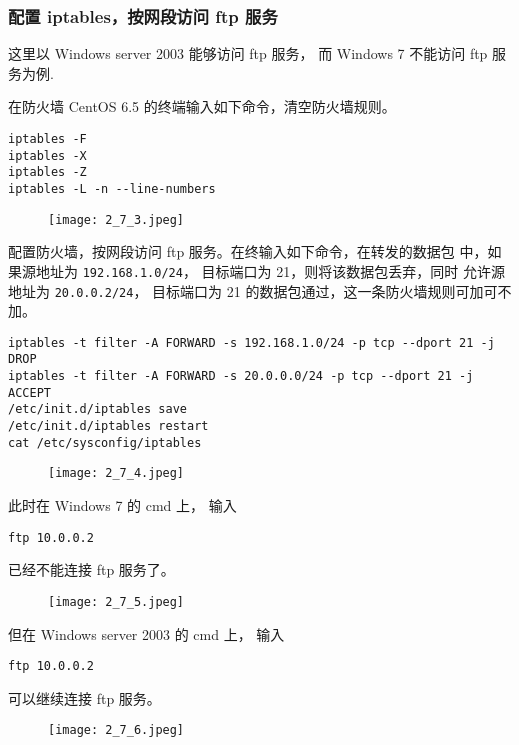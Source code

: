\subsubsection{配置 iptables，按网段访问 ftp 服务}
这里以 Windows server 2003 能够访问 ftp 服务，
而 Windows 7 不能访问 ftp 服务为例.

在防火墙 CentOS 6.5 的终端输入如下命令，清空防火墙规则。
\begin{verbatim}
iptables -F
iptables -X
iptables -Z
iptables -L -n --line-numbers
\end{verbatim}
\begin{figure}[H]
  \begin{center}
    \texttt{[image: 2\_7\_3.jpeg]}
  \end{center}
\end{figure}

配置防火墙，按网段访问 ftp 服务。在终输入如下命令，在转发的数据包
中，如果源地址为 \texttt{192.168.1.0/24}，
目标端口为 21，则将该数据包丢弃，同时
允许源地址为 \texttt{20.0.0.2/24}，
目标端口为 21 的数据包通过，这一条防火墙规则可加可不加。
\begin{verbatim}
iptables -t filter -A FORWARD -s 192.168.1.0/24 -p tcp --dport 21 -j DROP
iptables -t filter -A FORWARD -s 20.0.0.0/24 -p tcp --dport 21 -j ACCEPT
/etc/init.d/iptables save
/etc/init.d/iptables restart
cat /etc/sysconfig/iptables
\end{verbatim}
\begin{figure}[H]
  \begin{center}
    \texttt{[image: 2\_7\_4.jpeg]}
  \end{center}
\end{figure}

此时在 Windows 7 的 cmd 上，
输入
\begin{verbatim}
ftp 10.0.0.2
\end{verbatim}
已经不能连接 ftp 服务了。
\begin{figure}[H]
  \begin{center}
    \texttt{[image: 2\_7\_5.jpeg]}
  \end{center}
\end{figure}

但在 Windows server 2003 的 cmd 上，
输入
\begin{verbatim}
ftp 10.0.0.2
\end{verbatim}
可以继续连接 ftp 服务。
\begin{figure}[H]
  \begin{center}
    \texttt{[image: 2\_7\_6.jpeg]}
  \end{center}
\end{figure}
%

